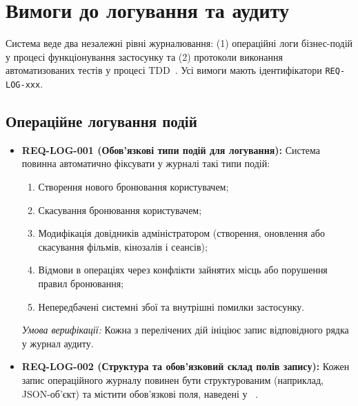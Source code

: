 \section{Вимоги до логування та аудиту}\label{sec:loguvannia}

Система веде два незалежні рівні журналювання: (1) операційні логи бізнес-подій у процесі функціонування застосунку та (2) протоколи виконання автоматизованих тестів у процесі TDD~. Усі вимоги мають ідентифікатори \texttt{REQ-LOG-xxx}.

\subsection{Операційне логування подій}\label{sec:loguvannia-podii}

\begin{itemize}[leftmargin=*,labelindent=0pt]
    \item \textbf{REQ-LOG-001 (Обов'язкові типи подій для логування):} Система повинна автоматично фіксувати у журналі такі типи подій:
    \begin{enumerate}
        \item Створення нового бронювання користувачем;
        \item Скасування бронювання користувачем;
        \item Модифікація довідників адміністратором (створення, оновлення або скасування фільмів, кінозалів і сеансів);
        \item Відмови в операціях через конфлікти зайнятих місць або порушення правил бронювання;
        \item Непередбачені системні збої та внутрішні помилки застосунку.~
    \end{enumerate}
    \textit{Умова верифікації:} Кожна з перелічених дій ініціює запис відповідного рядка у журнал аудиту.

    \item \textbf{REQ-LOG-002 (Структура та обов'язковий склад полів запису):} Кожен запис операційного журналу повинен бути структурованим (наприклад, JSON-об'єкт) та містити обов'язкові поля, наведені у ~.
\end{itemize}

